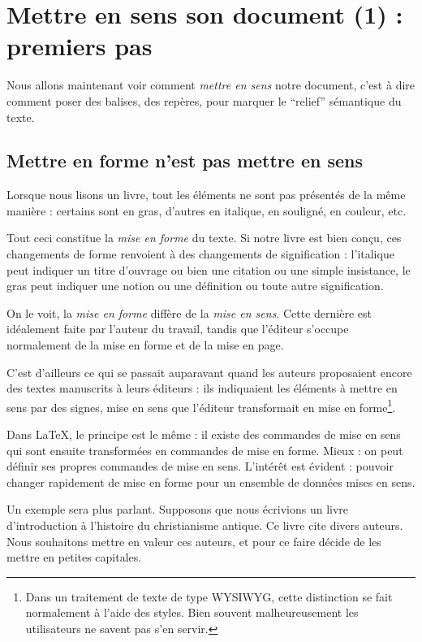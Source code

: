\chapter{Mettre en sens son document (1) : premiers pas}

\begin{intro}
Nous allons maintenant voir comment \emph{mettre en sens} notre document, c'est à dire comment poser des balises, des repères, pour marquer le \enquote{relief} sémantique du texte.
\end{intro}

\section{Mettre en forme n'est pas mettre en sens}\label{sensforme}

Lorsque nous lisons un livre, tout les éléments ne sont pas présentés de la même manière : certains sont en gras, d'autres en italique, en souligné, en couleur, etc. 

Tout ceci constitue la \emph{mise en forme} du texte. Si notre livre est bien conçu, ces changements de forme renvoient à des changements de signification : l'italique peut indiquer un titre d'ouvrage ou bien une citation ou une simple insistance, le gras peut indiquer une notion ou une définition ou toute autre signification.

On le voit, la \emph{mise en forme} diffère de la \emph{mise en sens}. Cette dernière est idéalement faite par l'auteur du travail, tandis que l'éditeur s'occupe normalement de la mise en forme et de la mise en page.

C'est d'ailleurs ce qui se passait auparavant quand les auteurs proposaient encore des textes manuscrits à leurs éditeurs : ils indiquaient les éléments à mettre en sens par des signes, mise en sens que l'éditeur transformait en mise en forme\footnote{Dans un traitement de texte de type WYSIWYG, cette distinction se fait normalement à l'aide des styles. Bien souvent malheureusement les utilisateurs ne savent pas s'en servir.}.

Dans \LaTeX, le principe est le même : il existe des commandes de mise en sens qui sont ensuite transformées en commandes de mise en forme. Mieux : on peut définir ses propres commandes de mise en sens. L'intérêt est  évident : pouvoir changer rapidement de mise en forme pour un ensemble de données mises en sens.

Un exemple sera plus parlant. Supposons que nous écrivions un livre d'introduction à l'histoire du christianisme antique. Ce livre cite divers auteurs. Nous souhaitons mettre en valeur ces auteurs, et pour ce faire décide de les mettre en petites capitales.

